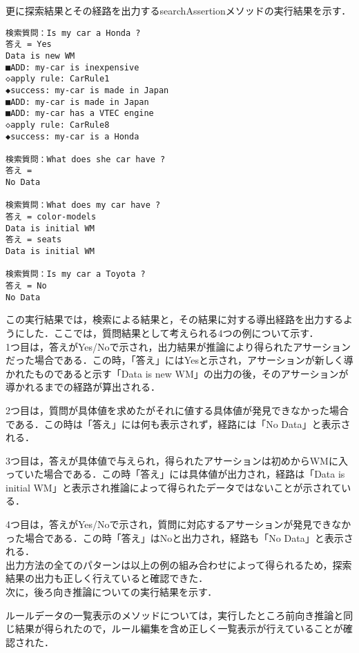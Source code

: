 \documentclass[12pt]{jarticle}
\begin{document}
更に探索結果とその経路を出力するsearchAssertionメソッドの実行結果を示す．
\begin{lstlisting}[caption=searchAssertionメソッドの実行結果,label=kekka3]
検索質問：Is my car a Honda ?
答え = Yes
Data is new WM
■ADD: my-car is inexpensive
◇apply rule: CarRule1
◆success: my-car is made in Japan
■ADD: my-car is made in Japan
■ADD: my-car has a VTEC engine
◇apply rule: CarRule8
◆success: my-car is a Honda

検索質問：What does she car have ?
答え = 
No Data

検索質問：What does my car have ?
答え = color-models
Data is initial WM
答え = seats
Data is initial WM

検索質問：Is my car a Toyota ?
答え = No
No Data
\end{lstlisting}
この実行結果では，検索による結果と，その結果に対する導出経路を出力するようにした．ここでは，質問結果として考えられる4つの例について示す．\\

1つ目は，答えがYes/Noで示され，出力結果が推論により得られたアサーションだった場合である．この時，「答え」にはYesと示され，アサーションが新しく導かれたものであると示す「Data is new WM」の出力の後，そのアサーションが導かれるまでの経路が算出される．\par
2つ目は，質問が具体値を求めたがそれに値する具体値が発見できなかった場合である．この時は「答え」には何も表示されず，経路には「No Data」と表示される．\par
3つ目は，答えが具体値で与えられ，得られたアサーションは初めからWMに入っていた場合である．この時「答え」には具体値が出力され，経路は「Data is initial WM」と表示され推論によって得られたデータではないことが示されている．\par
4つ目は，答えがYes/Noで示され，質問に対応するアサーションが発見できなかった場合である．この時「答え」はNoと出力され，経路も「No Data」と表示される．\\

出力方法の全てのパターンは以上の例の組み合わせによって得られるため，探索結果の出力も正しく行えていると確認できた．\\

次に，後ろ向き推論についての実行結果を示す．\par
ルールデータの一覧表示のメソッドについては，実行したところ前向き推論と同じ結果が得られたので，ルール編集を含め正しく一覧表示が行えていることが確認された．\\
\end{document}
